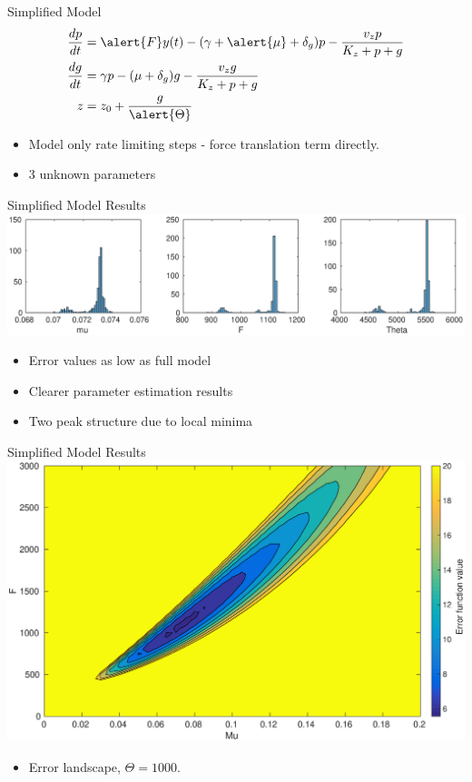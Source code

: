 \documentclass{beamer}
\begin{document}
\begin{frame}{Simplified Model}
\begin{align*}
\frac{dp}{dt} & = \alert{F}y(t)-(\gamma + \alert{\mu} + \delta_{g})p - \frac{v_{z}p}{K_{z}+p+g}   \\
\frac{dg}{dt} & = \gamma p - (\mu + \delta_{g})g - \frac{v_{z}g}{K_{z}+p+g}  \\
z &= z_{0} +\frac{g}{\alert{\Theta}} 
\end{align*}
\begin{itemize}
\item  Model only rate limiting steps - force translation term directly.
\item 3 unknown parameters
\end{itemize}
\end{frame}


\begin{frame}{Simplified Model Results}
  \includegraphics[scale = 0.28, clip = true, trim = 100 0 0 400]{../Figures/13_9_hist_simplified}
  \begin{itemize}
\item  Error values as low as full model
\item Clearer parameter estimation results
\item Two peak structure due to local minima
\end{itemize}
\end{frame}

\begin{frame}{Simplified Model Results}
  \includegraphics[scale = 0.25, clip = true, trim = 60 0 0 00]{../Figures/Likelihood_profile_rough}
    \begin{itemize}
\item  Error landscape, $\Theta = 1000$.
\end{itemize}
\end{frame}
\end{document}
